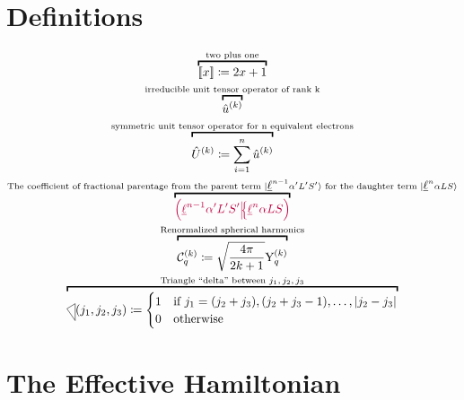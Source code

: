 \documentclass{article}
\begin{document}
\section{Definitions}  

\begin{gather} 
    \overbracket{\tpobraket{x} \DEF 2x+1}^{\text{two plus one}} \\
    \overbracket{\op{u}^{(k)}}^{\text{irreducible unit tensor operator of rank k}} \\ 
    \overbracket{\op{U}^{(k)} \DEF \sum_{i=1}^{n} \op{u}^{(k)} }^{\text{symmetric unit tensor operator for n equivalent electrons}} \\
    \overbracket{\cfp{\lorb^{n-1}\alpha'L'S'}{\lorb^n\alpha{L}{S}}}^{\text{The coefficient of fractional parentage from the parent term }\ket{\lorb^{n-1}\alpha'{L'S'}}\text{ for the daughter term }\ket{\lorb^{n}\alpha{LS}}} \\
    \overbracket{\Ckq \DEF \sqrt{\frac{4\pi}{2k+1}} \Ykq}^{\text{Renormalized spherical harmonics}} \\
    \overbracket{\tricondition{j_1,j_2,j_3} \DEF
    \begin{cases} 
        1 & \text{if } j_1 = (j_2 + j_3), (j_2 + j_3 - 1), \ldots, |j_2-j_3|\\
        0 & \text{otherwise}
        \end{cases}}^{\text{Triangle ``delta'' between $j_1,j_2,j_3$}} 
\end{gather}

\section{The Effective Hamiltonian} 
\end{document}
